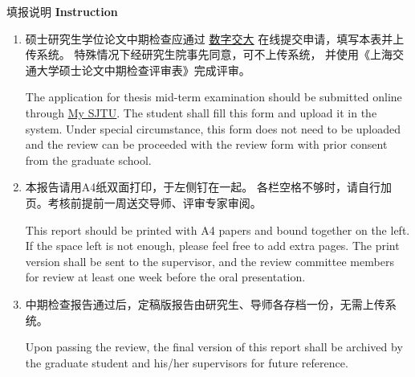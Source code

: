 \documentclass[a4paper,zihao=-4,AutoFakeBold]{ctexart}
\begin{document}
\clearpage

\pagestyle{fancy}
\fancyfootoffset{0pt}

\begin{center}
    {\heiti 填报说明} {\bfseries Instruction}
\end{center}

\begin{enumerate}[parsep=.5\baselineskip]
    \fangsong
    \item 硕士研究生学位论文中期检查应通过%
          \href{http://my.sjtu.edu.cn/}{\color{blue}\underline{数字交大}}%
          在线提交申请，填写本表并上传系统。
          特殊情况下经研究生院事先同意，可不上传系统，
          并使用《上海交通大学硕士论文中期检查评审表》完成评审。

          The application for thesis mid-term examination
          should be submitted online through
          \href{http://my.sjtu.edu.cn/}{\color{blue}\underline{My SJTU}}.
          The student shall fill this form and upload it in the system.
          Under special circumstance, this form does not need to be
          uploaded and the review can be proceeded with the review
          form with prior consent from the graduate school.

    \item 本报告请用A4纸双面打印，于左侧钉在一起。
          各栏空格不够时，请自行加页。考核前提前一周送交导师、评审专家审阅。

          This report should be printed with A4 papers and bound
          together on the left. If the space left is not enough,
          please feel free to add extra pages.
          The print version shall be sent to the supervisor,
          and the review committee members for review at least
          one week before the oral presentation.

    \item 中期检查报告通过后，定稿版报告由研究生、导师各存档一份，无需上传系统。
    
          Upon passing the review, 
          the final version of this report shall be archived by 
          the graduate student and his/her supervisors for 
          future reference.
\end{enumerate}


\clearpage
\restoregeometry
\setcounter{page}{1}
\fancyfootoffset{0pt}
\end{document}

